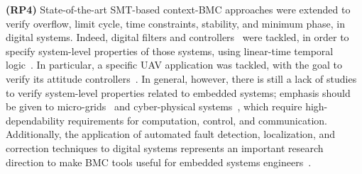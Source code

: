 \documentclass{acm_sen_article}
\begin{document}
\textbf{(RP4)} State-of-the-art SMT-based context-BMC approaches were extended to verify overflow, limit cycle, time constraints, stability, and minimum phase, in digital systems. Indeed, digital filters and controllers~\cite{dsv_spin2015,esbmc_controller,esbmc_filter} were tackled, in order to specify system-level properties of those systems, using linear-time temporal logic~\cite{JMorse15}. In particular, a specific UAV application was tackled, with the goal to verify its attitude controllers~\cite{Bessa16,Chaves17}. In general, however, there is still a lack of studies to verify system-level properties related to embedded systems; emphasis should be given to micro-grids~\cite{xu15} and cyber-physical systems~\cite{leeCPS2}, which require high-dependability requirements for computation, control, and communication. Additionally, the application of automated fault detection, localization, and correction techniques to digital systems represents an important research direction to make BMC tools useful for embedded systems engineers~\cite{Alves15}.
\end{document}
